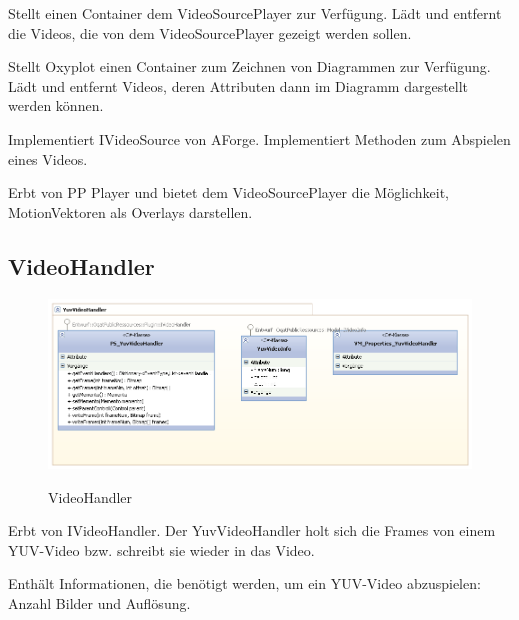 Stellt einen Container dem VideoSourcePlayer zur Verfügung. Lädt und entfernt die Videos, die von dem VideoSourcePlayer gezeigt werden sollen.


Stellt Oxyplot einen Container zum Zeichnen von Diagrammen zur Verfügung. Lädt und entfernt Videos, deren Attributen dann im Diagramm dargestellt werden können.


Implementiert IVideoSource von AForge. Implementiert Methoden zum Abspielen eines Videos.


Erbt von PP Player und bietet dem VideoSourcePlayer die Möglichkeit, MotionVektoren als Overlays darstellen.


\pagebreak
\subsection{VideoHandler}
\begin{figure}[h]
\noindent\includegraphics[width=\linewidth,height=\textheight,
keepaspectratio]{bilder/YuvvideoHandler.png}
\label{}
\caption{VideoHandler}
\end{figure}

Erbt von IVideoHandler. Der YuvVideoHandler holt sich die Frames von einem YUV-Video bzw. schreibt sie wieder in das Video.

Enthält Informationen, die benötigt werden, um ein YUV-Video abzuspielen: Anzahl Bilder und Auflösung.


\pagebreak
